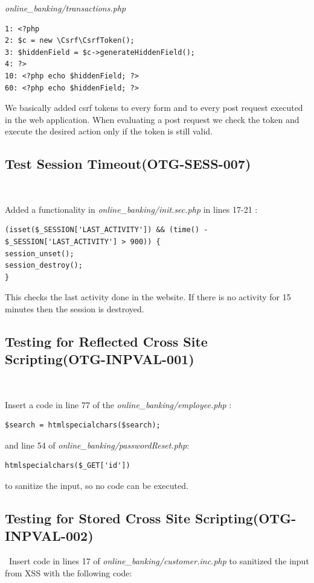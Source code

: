 \documentclass[headsepline,footsepline,footinclude=false,oneside,fontsize=11pt,paper=a4,listof=totoc,bibliography=totoc]{scrbook} %
\begin{document}
\textit{online\_banking/transactions.php}
\begin{lstlisting} 
1: <?php
2: $c = new \Csrf\CsrfToken();
3: $hiddenField = $c->generateHiddenField();
4: ?>
10: <?php echo $hiddenField; ?>
60: <?php echo $hiddenField; ?>
\end{lstlisting}

We basically added csrf tokens to every form and to every post request executed in the web application. When evaluating a post request we check the token and execute the desired action only if the token is still valid.

\pagebreak
\subsection{Test Session Timeout(OTG-SESS-007)}\

Added a functionality in \textit{online\_banking/init.sec.php} in lines 17-21 :  


\begin{lstlisting}
(isset($_SESSION['LAST_ACTIVITY']) && (time() - $_SESSION['LAST_ACTIVITY'] > 900)) { 
session_unset();    
session_destroy();   
}
\end{lstlisting} 


This checks the last activity done in the website. If there is no activity for 15 minutes then the session is destroyed.\\



\subsection{Testing for Reflected Cross Site Scripting(OTG-INPVAL-001)} \

Insert a code in line 77 of the\textit{ online\_banking/employee.php} : 
\begin{lstlisting}
$search = htmlspecialchars($search);  

\end{lstlisting}
and line 54 of \textit{online\_banking/passwordReset.php}:  
\begin{lstlisting} 
htmlspecialchars($_GET['id']) 
\end{lstlisting}
to sanitize the input, so no code can be executed.
\pagebreak
\subsection{Testing for Stored Cross Site Scripting(OTG-INPVAL-002)}\
Insert code in lines 17 of \textit{online\_banking/customer.inc.php} to sanitized the input from XSS with the following code:   
\end{document}

